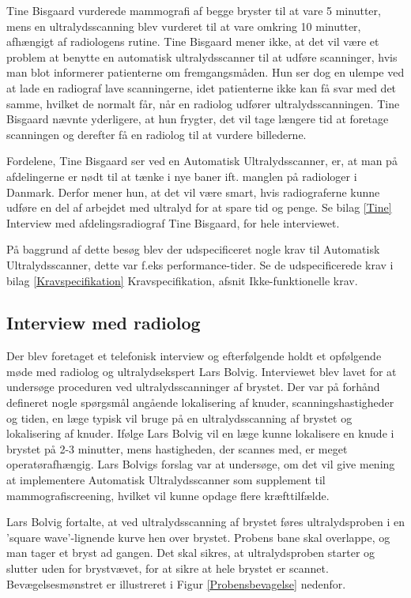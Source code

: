 Tine Bisgaard vurderede mammografi af begge bryster til at vare 5 minutter, mens en ultralydsscanning blev vurderet til at vare omkring 10 minutter, afhængigt af radiologens rutine. Tine Bisgaard mener ikke, at det vil være et problem at benytte en automatisk ultralydsscanner til at udføre scanninger, hvis man blot informerer patienterne om fremgangsmåden. Hun ser dog en ulempe ved at lade en radiograf lave scanningerne, idet patienterne ikke kan få svar med det samme, hvilket de normalt får, når en radiolog udfører ultralydsscanningen. Tine Bisgaard nævnte yderligere, at hun frygter, det vil tage længere tid at foretage scanningen og derefter få en radiolog til at vurdere billederne.

Fordelene, Tine Bisgaard ser ved en Automatisk Ultralydsscanner, er, at man på afdelingerne er nødt til at tænke i nye baner ift. manglen på radiologer i Danmark. Derfor mener hun, at det vil være smart, hvis radiograferne kunne udføre en del af arbejdet med ultralyd for at spare tid og penge. Se bilag \ref{Tine} Interview med afdelingsradiograf Tine Bisgaard, for hele interviewet. 

På baggrund af dette besøg blev der udspecificeret nogle krav til Automatisk Ultralydsscanner, dette var f.eks performance-tider. Se de udspecificerede krav i bilag \ref{Kravspecifikation} Kravspecifikation, afsnit Ikke-funktionelle krav. 

\subsection{Interview med radiolog}
Der blev foretaget et telefonisk interview og efterfølgende holdt et opfølgende møde med radiolog og ultralydsekspert Lars Bolvig. Interviewet blev lavet for at undersøge proceduren ved ultralydsscanninger af brystet. Der var på forhånd defineret nogle spørgsmål angående lokalisering af knuder, scanningshastigheder og tiden, en læge typisk vil bruge på en ultralydsscanning af brystet og lokalisering af knuder. Ifølge Lars Bolvig vil en læge kunne lokalisere en knude i brystet på 2-3 minutter, mens hastigheden, der scannes med, er meget operatørafhængig. Lars Bolvigs forslag var at undersøge, om det vil give mening at implementere Automatisk Ultralydsscanner som supplement til mammografiscreening, hvilket vil kunne opdage flere kræfttilfælde. 

Lars Bolvig fortalte, at ved ultralydsscanning af brystet føres ultralydsproben i en 'square wave'-lignende kurve hen over brystet. Probens bane skal overlappe, og man tager et bryst ad gangen. Det skal sikres, at ultralydsproben starter og slutter uden for brystvævet, for at sikre at hele brystet er scannet. Bevægelsesmønstret er illustreret i Figur \ref{Probensbevagelse} nedenfor. 

